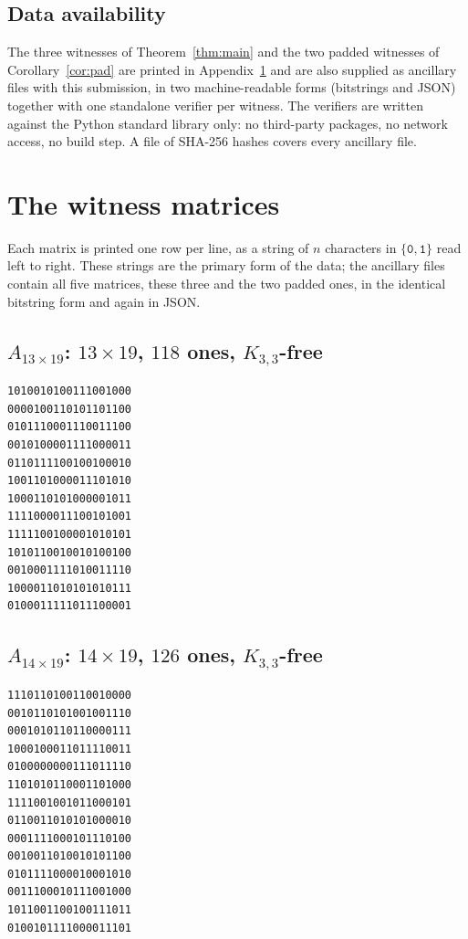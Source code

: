 \documentclass[11pt,reqno]{amsart}
\theoremstyle{plain}
\theoremstyle{remark}
\begin{document}
\subsection*{Data availability}
The three witnesses of Theorem~\ref{thm:main} and the two padded witnesses of
Corollary~\ref{cor:pad} are printed in Appendix~\ref{sec:witnesses} and are also supplied as
ancillary files with this submission, in two machine-readable forms (bitstrings and JSON) together
with one standalone verifier per witness. The verifiers are written against the Python standard
library only: no third-party packages, no network access, no build step. A file of SHA-256 hashes
covers every ancillary file.

\appendix

\section{The witness matrices}\label{sec:witnesses}

Each matrix is printed one row per line, as a string of $n$ characters in $\{\texttt{0},\texttt{1}\}$
read left to right. These strings are the primary form of the data; the ancillary files contain all
five matrices, these three and the two padded ones, in the identical bitstring form and again in
JSON.

\subsection*{\texorpdfstring{$A_{13\times19}$: $13\times19$, $118$ ones, $K_{3,3}$-free}
                            {A(13x19): 13 x 19, 118 ones, K(3,3)-free}}
\begin{verbatim}
1010010100111001000
0000100110101101100
0101110001110011100
0010100001111000011
0110111100100100010
1001101000011101010
1000110101000001011
1111000011100101001
1111100100001010101
1010110010010100100
0010001111010011110
1000011010101010111
0100011111011100001
\end{verbatim}

\subsection*{\texorpdfstring{$A_{14\times19}$: $14\times19$, $126$ ones, $K_{3,3}$-free}
                            {A(14x19): 14 x 19, 126 ones, K(3,3)-free}}
\begin{verbatim}
1110110100110010000
0010110101001001110
0001010110110000111
1000100011011110011
0100000000111011110
1101010110001101000
1111001001011000101
0110011010101000010
0001111000101110100
0010011010010101100
0101111000010001010
0011100010111001000
1011001100100111011
0100101111000011101
\end{verbatim}
\end{document}

